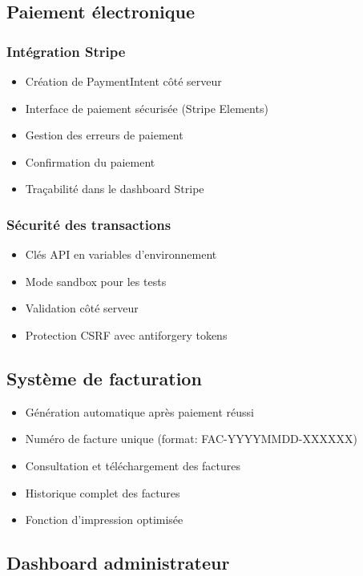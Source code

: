 \documentclass[12pt,a4paper]{article}
\begin{document}
\subsection{Paiement électronique}

\subsubsection{Intégration Stripe}
\begin{itemize}
    \item Création de PaymentIntent côté serveur
    \item Interface de paiement sécurisée (Stripe Elements)
    \item Gestion des erreurs de paiement
    \item Confirmation du paiement
    \item Traçabilité dans le dashboard Stripe
\end{itemize}

\subsubsection{Sécurité des transactions}
\begin{itemize}
    \item Clés API en variables d'environnement
    \item Mode sandbox pour les tests
    \item Validation côté serveur
    \item Protection CSRF avec antiforgery tokens
\end{itemize}

\subsection{Système de facturation}
\begin{itemize}
    \item Génération automatique après paiement réussi
    \item Numéro de facture unique (format: FAC-YYYYMMDD-XXXXXX)
    \item Consultation et téléchargement des factures
    \item Historique complet des factures
    \item Fonction d'impression optimisée
\end{itemize}

\subsection{Dashboard administrateur}
\end{document}
